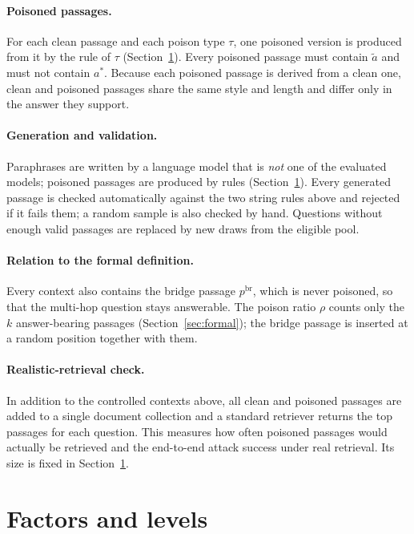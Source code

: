\documentclass[11pt,a4paper]{report}
\begin{document}
\paragraph{Poisoned passages.}
For each clean passage and each poison type $\tau$, one poisoned version
is produced from it by the rule of $\tau$ (Section~\ref{sec:factors}).
Every poisoned passage must contain $\tilde{a}$ and must not contain
$a^{*}$. Because each poisoned passage is derived from a clean one, clean
and poisoned passages share the same style and length and differ only in
the answer they support.


\paragraph{Generation and validation.}
Paraphrases are written by a language model that is \emph{not} one of the
evaluated models; poisoned passages are produced by rules
(Section~\ref{sec:factors}). Every generated passage is checked
automatically against the two string rules above and rejected if it fails
them; a random sample is also checked by hand. Questions without enough
valid passages are replaced by new draws from the eligible pool.



\paragraph{Relation to the formal definition.}
Every context also contains the bridge passage $p^{\mathrm{br}}$, which is
never poisoned, so that the multi-hop question stays answerable. The poison
ratio $\rho$ counts only the $k$ answer-bearing passages
(Section~\ref{sec:formal}); the bridge passage is inserted at a random
position together with them.

\paragraph{Realistic-retrieval check.}
In addition to the controlled contexts above, all clean and poisoned
passages are added to a single document collection and a standard retriever
returns the top passages for each question. This measures how often
poisoned passages would actually be retrieved and the end-to-end attack
success under real retrieval. Its size is fixed in
Section~\ref{sec:factors}.

\section{Factors and levels}\label{sec:factors}
\end{document}
